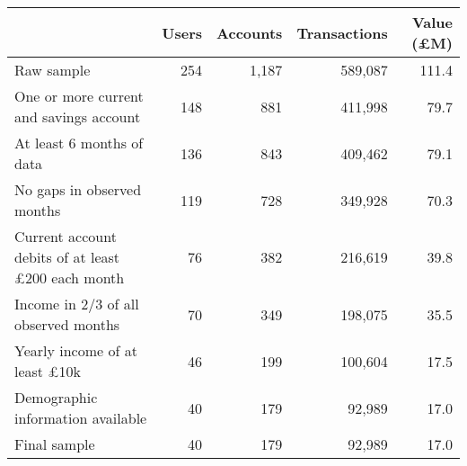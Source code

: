 \begin{tabular}{lrrrr}
\toprule
                                                         & Users & Accounts & Transactions & Value (\pounds M) \\
\midrule
                                              Raw sample &   254 &    1,187 &      589,087 &             111.4 \\
                 One or more current and savings account &   148 &      881 &      411,998 &              79.7 \\
                               At least 6 months of data &   136 &      843 &      409,462 &              79.1 \\
                              No gaps in observed months &   119 &      728 &      349,928 &              70.3 \\
Current account debits of at least \pounds200 each month &    76 &      382 &      216,619 &              39.8 \\
                    Income in 2/3 of all observed months &    70 &      349 &      198,075 &              35.5 \\
                    Yearly income of at least \pounds10k &    46 &      199 &      100,604 &              17.5 \\
                       Demographic information available &    40 &      179 &       92,989 &              17.0 \\
                                            Final sample &    40 &      179 &       92,989 &              17.0 \\
\bottomrule
\end{tabular}

